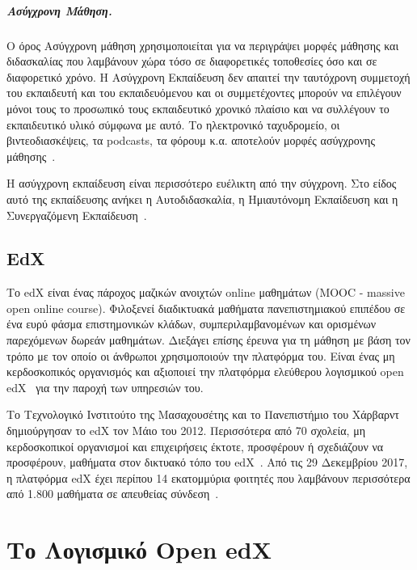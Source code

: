 \documentclass[12pt]{report}
\begin{document}
  \paragraph{Ασύγχρονη Μάθηση.} Ο όρος Ασύγχρονη μάθηση χρησιμοποιείται για να περιγράψει μορφές μάθησης και διδασκαλίας που λαμβάνουν χώρα τόσο σε διαφορετικές τοποθεσίες όσο και σε διαφορετικό χρόνο. Η Ασύγχρονη Εκπαίδευση δεν απαιτεί την ταυτόχρονη συμμετοχή του εκπαιδευτή και του εκπαιδευόμενου και οι συμμετέχοντες μπορούν να επιλέγουν μόνοι τους το προσωπικό τους εκπαιδευτικό χρονικό πλαίσιο και να συλλέγουν το εκπαιδευτικό υλικό σύμφωνα με αυτό. Το ηλεκτρονικό ταχυδρομείο, οι βιντεοδιασκέψεις, τα \textlatin{podcasts}, τα φόρουμ κ.α. αποτελούν μορφές ασύγχρονης μάθησης~\cite{stefan_hrastinski_2008}.

Η ασύγχρονη εκπαίδευση είναι περισσότερο ευέλικτη από την σύγχρονη. Στο είδος αυτό της εκπαίδευσης ανήκει η Αυτοδιδασκαλία, η Ημιαυτόνομη Εκπαίδευση και η Συνεργαζόμενη Εκπαίδευση~\cite{wikipedia_2018_1}.

\section{\textlatin{EdX}}
Το \textlatin{edX} είναι ένας πάροχος μαζικών ανοιχτών \textlatin{online} μαθημάτων (\textlatin{MOOC - massive open online course)}. Φιλοξενεί διαδικτυακά μαθήματα πανεπιστημιακού επιπέδου σε ένα ευρύ φάσμα επιστημονικών κλάδων, συμπεριλαμβανομένων και ορισμένων παρεχόμενων δωρεάν μαθημάτων. Διεξάγει επίσης έρευνα για τη μάθηση με βάση τον τρόπο με τον οποίο οι άνθρωποι χρησιμοποιούν την πλατφόρμα του. Είναι ένας μη κερδοσκοπικός οργανισμός και αξιοποιεί την πλατφόρμα ελεύθερου λογισμικού \textlatin{open edX}~\cite{edx_2018} για την παροχή των υπηρεσιών του.

Το Τεχνολογικό Ινστιτούτο της Μασαχουσέτης και το Πανεπιστήμιο του Χάρβαρντ δημιούργησαν το \textlatin{edX} τον Μάιο του 2012. Περισσότερα από 70 σχολεία, μη κερδοσκοπικοί οργανισμοί και επιχειρήσεις έκτοτε, προσφέρουν ή σχεδιάζουν να προσφέρουν, μαθήματα στον δικτυακό τόπο του \textlatin{edX}~\cite{edx_2019_1}. Από τις 29 Δεκεμβρίου 2017, η πλατφόρμα \textlatin{edX} έχει περίπου 14 εκατομμύρια φοιτητές που λαμβάνουν περισσότερα από 1.800 μαθήματα σε απευθείας σύνδεση~\cite{report_2018}.


\chapter{Το Λογισμικό \textlatin{Open edX}}\label{ch2}
\end{document}
